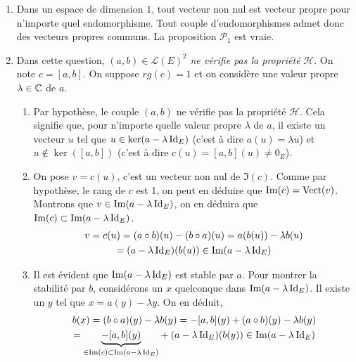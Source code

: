 \begin{enumerate}
\item Dans un espace de dimension $1$, tout vecteur non nul est vecteur propre pour n'importe quel endomorphisme. Tout couple d'endomorphismes admet donc des vecteurs propres communs. La proposition $\mathcal{P}_1$ est vraie.
 
\item \label{consuf} Dans cette question, $(a,b)\in \mathcal{L}(E)^2$ \emph{ne vérifie pas la propriété} $\mathcal{H}$. On note $c=[a,b]$. On suppose $rg(c)=1$ et on considère une valeur propre $\lambda\in \mathbb{C}$ de $a$.
\begin{enumerate}
 \item Par hypothèse, le couple $(a,b)$ ne vérifie pas la propriété $\mathcal{H}$. Cela signifie que, pour n'importe quelle valeur propre $\lambda$ de $a$, il existe un vecteur $u$ tel que $u\in \ker(a-\lambda \operatorname{Id}_E)$ (c'est à dire $a(u)=\lambda u$) et $u\notin \ker([a,b])$ (c'est à dire $c(u)=[a,b](u)\neq 0_E$).
 \item On pose $v=c(u)$, c'est un vecteur non nul de $\Im(c)$. Comme par hypothèse, le rang de $c$ est 1, on peut en déduire que $\operatorname{Im}(c)=\operatorname{Vect}(v)$.\newline
Montrons que $v\in\operatorname{Im}(a-\lambda \operatorname{Id}_E)$, on en déduira que $\operatorname{Im}(c)\subset \operatorname{Im}(a-\lambda \operatorname{Id}_E)$.
\begin{multline*}
 v=c(u) = (a\circ b)(u) -(b\circ a)(u)  
= a(b(u)) - \lambda b(u) \\
= (a-\lambda \operatorname{Id}_E)(b(u))\in \operatorname{Im}(a-\lambda \operatorname{Id}_E)
\end{multline*}
 
 \item Il est évident que $\operatorname{Im}(a-\lambda \operatorname{Id}_E)$ est stable par $a$. Pour montrer la stabilité par $b$, considérons un $x$ quelconque dans $\operatorname{Im}(a-\lambda \operatorname{Id}_E)$. Il existe un $y$ tel que $x=a(y)-\lambda y$. On en déduit,
\begin{multline*}
b(x) = (b\circ a)(y)-\lambda b(y) = -[a,b](y)+(a\circ b)(y)-\lambda b(y)\\
=  \underset{\in \operatorname{Im}(c)\subset \operatorname{Im}(a-\lambda \operatorname{Id}_E)}{\underbrace{-[a,b](y)}}+(a-\lambda \operatorname{Id}_E)(b(y)) \in \operatorname{Im}(a-\lambda \operatorname{Id}_E)
\end{multline*}

\end{enumerate}
 

\end{enumerate}
